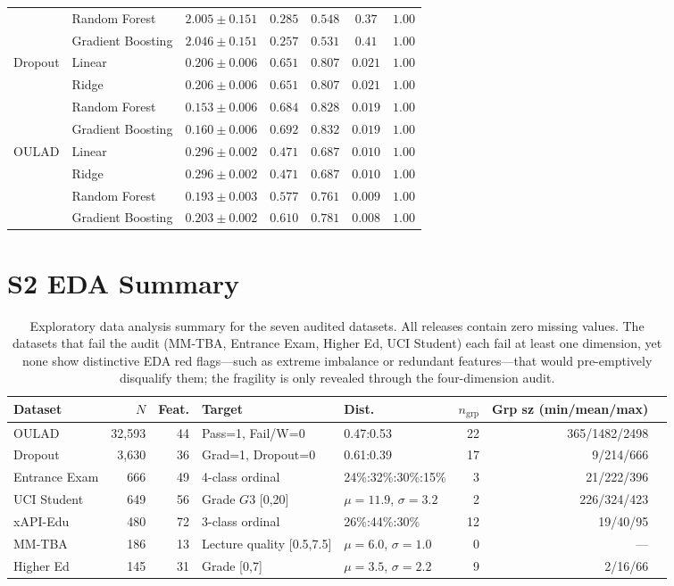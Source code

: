 \documentclass[10pt,letterpaper]{article}
\begin{document}
\begin{table}[!h]
\begin{tabular}{l l c c c c c}
 & Random Forest & $2.005 \pm 0.151$ & $0.285$ & $0.548$ & $0.37$ & $1.00$ \\
 & Gradient Boosting & $2.046 \pm 0.151$ & $0.257$ & $0.531$ & $0.41$ & $1.00$ \\
\midrule
Dropout & Linear & $0.206 \pm 0.006$ & $0.651$ & $0.807$ & $0.021$ & $1.00$ \\
 & Ridge & $0.206 \pm 0.006$ & $0.651$ & $0.807$ & $0.021$ & $1.00$ \\
 & Random Forest & $0.153 \pm 0.006$ & $0.684$ & $0.828$ & $0.019$ & $1.00$ \\
 & Gradient Boosting & $0.160 \pm 0.006$ & $0.692$ & $0.832$ & $0.019$ & $1.00$ \\
\midrule
OULAD & Linear & $0.296 \pm 0.002$ & $0.471$ & $0.687$ & $0.010$ & $1.00$ \\
 & Ridge & $0.296 \pm 0.002$ & $0.471$ & $0.687$ & $0.010$ & $1.00$ \\
 & Random Forest & $0.193 \pm 0.003$ & $0.577$ & $0.761$ & $0.009$ & $1.00$ \\
 & Gradient Boosting & $0.203 \pm 0.002$ & $0.610$ & $0.781$ & $0.008$ & $1.00$ \\
\bottomrule
\end{tabular}
\end{table}

\clearpage
\section*{S2 EDA Summary}

\begin{table}[!h]
\centering
\caption{Exploratory data analysis summary for the seven audited datasets. All releases contain zero missing values. The datasets that fail the audit (MM-TBA, Entrance Exam, Higher Ed, UCI Student) each fail at least one dimension, yet none show distinctive EDA red flags---such as extreme imbalance or redundant features---that would pre-emptively disqualify them; the fragility is only revealed through the four-dimension audit.}
\label{tab:eda_summary}
\small
\begin{tabular}{l r r l l r r r}
\toprule
Dataset & $N$ & Feat. & Target & Dist. & $n_{\mathrm{grp}}$ & Grp sz (min/mean/max) \\
\midrule
OULAD & 32,593 & 44 & Pass=1, Fail/W=0 & 0.47:0.53 & 22 & 365/1482/2498 \\
Dropout & 3,630 & 36 & Grad=1, Dropout=0 & 0.61:0.39 & 17 & 9/214/666 \\
Entrance Exam & 666 & 49 & 4-class ordinal & 24\%:32\%:30\%:15\% & 3 & 21/222/396 \\
UCI Student & 649 & 56 & Grade $G3$ [0,20] & $\mu=11.9$, $\sigma=3.2$ & 2 & 226/324/423 \\
xAPI-Edu & 480 & 72 & 3-class ordinal & 26\%:44\%:30\% & 12 & 19/40/95 \\
MM-TBA & 186 & 13 & Lecture quality [0.5,7.5] & $\mu=6.0$, $\sigma=1.0$ & 0 & --- \\
Higher Ed & 145 & 31 & Grade [0,7] & $\mu=3.5$, $\sigma=2.2$ & 9 & 2/16/66 \\
\bottomrule
\end{tabular}
\end{table}
\end{document}
